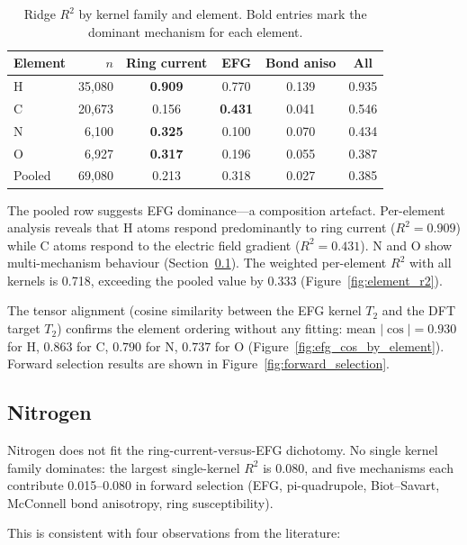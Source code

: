 \begin{table}[htbp]
  \centering
  \caption{Ridge $R^2$ by kernel family and element.  Bold entries mark
    the dominant mechanism for each element.}
  \label{tab:element-r2}
  \begin{tabular}{lrcccc}
    \toprule
    Element & $n$ & Ring current & EFG & Bond aniso & All \\
    \midrule
    H & 35{,}080 & \textbf{0.909} & 0.770 & 0.139 & 0.935 \\
    C & 20{,}673 & 0.156 & \textbf{0.431} & 0.041 & 0.546 \\
    N &  6{,}100 & \textbf{0.325} & 0.100 & 0.070 & 0.434 \\
    O &  6{,}927 & \textbf{0.317} & 0.196 & 0.055 & 0.387 \\
    \midrule
    Pooled & 69{,}080 & 0.213 & 0.318 & 0.027 & 0.385 \\
    \bottomrule
  \end{tabular}
\end{table}

The pooled row suggests EFG dominance---a composition artefact.
Per-element analysis reveals that H atoms respond predominantly to ring
current ($R^2 = 0.909$) while C atoms respond to the electric field
gradient ($R^2 = 0.431$).  N and O show multi-mechanism behaviour
(Section~\ref{ssec:nitrogen}).  The weighted per-element $R^2$ with all
kernels is 0.718, exceeding the pooled value by 0.333
(Figure~\ref{fig:element_r2}).

The tensor alignment (cosine similarity between the EFG kernel $T_2$
and the DFT target $T_2$) confirms the element ordering without any
fitting: mean $\lvert\cos\rvert = 0.930$ for H, $0.863$ for C, $0.790$
for N, $0.737$ for O (Figure~\ref{fig:efg_cos_by_element}).  Forward
selection results are shown in Figure~\ref{fig:forward_selection}.


\subsection{Nitrogen}
\label{ssec:nitrogen}

Nitrogen does not fit the ring-current-versus-EFG dichotomy.  No single
kernel family dominates: the largest single-kernel $R^2$ is 0.080, and
five mechanisms each contribute 0.015--0.080 in forward selection (EFG,
pi-quadrupole, Biot--Savart, McConnell bond anisotropy, ring
susceptibility).

This is consistent with four observations from the literature:

